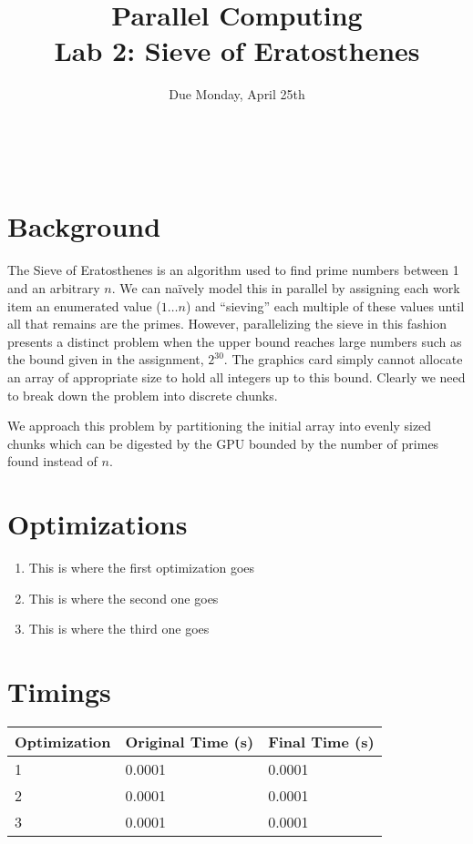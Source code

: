 \documentclass[12pt]{article}
\title{ Parallel Computing \\ Lab 2: Sieve of Eratosthenes }
\author{\MyFullName}
\date{ Due Monday, April 25th }
\begin{document}
\maketitle
\thispagestyle{empty}
\begin{center}
\end{center}
\setcounter{page}{0}
\newpage

\def\thesection{\Roman{section}.}
\hfill \\
\section{ Background }

\paragraph{}The Sieve of Eratosthenes is an algorithm used to find prime numbers between 1 and an arbitrary $n$. 
We can naïvely model this in parallel by assigning each work item an enumerated value ($1\ldots n$) and ``sieving'' each multiple of these values until all that remains are the primes. 
However, parallelizing the sieve in this fashion presents a distinct problem when the upper bound reaches large numbers such as the bound given in the assignment, $2^{30}$.
The graphics card simply cannot allocate an array of appropriate size to hold all integers up to this bound. 
Clearly we need to break down the problem into discrete chunks.

We approach this problem by partitioning the initial array into evenly sized chunks which can be digested by the GPU bounded by the number of primes found instead of $n$. 

\section{ Optimizations }
\begin{enumerate}[1.]
\item This is where the first optimization goes

\item This is where the second one goes

\item This is where the third one goes
\end{enumerate}

\section{ Timings }

\begin{center}
    \begin{tabular}{ | l | l | l |}
	\hline
   	Optimization & Original Time (s) & Final Time (s) \\ \hline
    	1 & 0.0001 & 0.0001 \\ \hline
	2 & 0.0001 & 0.0001 \\ \hline
	3 & 0.0001 & 0.0001 \\  \hline
    \end{tabular}
\end{center}
\end{document}
